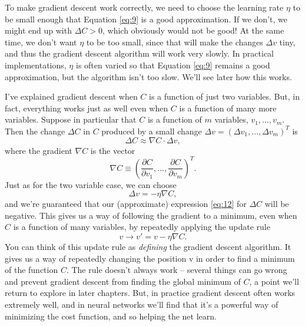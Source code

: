 \documentclass[a4paper,twoside,10pt]{book}
\begin{document}
To make gradient descent work correctly, we need to choose the learning rate $\eta$ to be small enough that Equation \ref{eq:9} is a good approximation. If we don't, we might end up with $\Delta C > 0$, which obviously would not be good! At the same time, we don't want $\eta$ to be too small, since that will make the changes $\Delta v$ tiny, and thus the gradient descent algorithm will work very slowly. In practical implementations, $\eta$ is often varied so that Equation \ref{eq:9} remains a good approximation, but the algorithm isn't too slow. We'll see later how this works.

I've explained gradient descent when $C$ is a function of just two variables. But, in fact, everything works just as well even when $C$ is a function of many more variables. Suppose in particular that $C$ is a function of $m$ variables, $v_1, \ldots,v_m$. Then the change $\Delta C$ in $C$ produced by a small change $\Delta v = (\Delta v_1, \ldots, \Delta v_m)^T$ is
\begin{equation}
	\Delta C \approx \nabla C \cdot \Delta v,
	\label{eq:12}
\end{equation}
where the gradient $\nabla C$ is the vector
\begin{equation}
\nabla C \equiv \left(\frac{\partial C}{\partial v_1}, \ldots, \frac{\partial C}{\partial v_m}\right)^T.
\label{eq:13}
\end{equation}
Just as for the two variable case, we can choose
\begin{equation}
\Delta v = -\eta \nabla C, \label{eq:14}
\end{equation}
and we're guaranteed that our (approximate) expression \ref{eq:12} for $\Delta C$ will be negative. This gives us a way of following the gradient to a minimum, even when $C$ is a function of many variables, by repeatedly applying the update rule
\begin{equation}
v \rightarrow v' = v-\eta \nabla C.
\label{eq:15}
\end{equation}
You can think of this update rule as \textit{defining} the gradient descent algorithm. It gives us a way of repeatedly changing the position v in order to find a minimum of the function $C$. The rule doesn't always work -- several things can go wrong and prevent gradient descent from finding the global minimum of $C$, a point we'll return to explore in later chapters. But, in practice gradient descent often works extremely well, and in neural networks we'll find that it's a powerful way of minimizing the cost function, and so helping the net learn.
\end{document}
